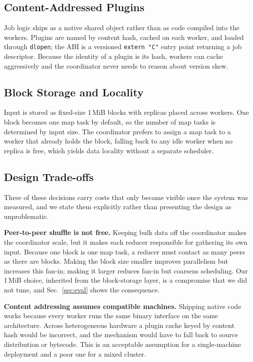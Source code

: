 \documentclass[conference]{IEEEtran}
\begin{document}
\subsection{Content-Addressed Plugins}

Job logic ships as a native shared object rather than as code compiled into
the workers. Plugins are named by content hash, cached on each worker, and
loaded through \texttt{dlopen}; the ABI is a versioned
\texttt{extern "C"} entry point returning a job descriptor. Because the
identity of a plugin is its hash, workers can cache aggressively and the
coordinator never needs to reason about version skew.

\subsection{Block Storage and Locality}

Input is stored as fixed-size 1\,MiB blocks with replicas placed across
workers. One block becomes one map task by default, so the number of map
tasks is determined by input size. The coordinator prefers to assign a map
task to a worker that already holds the block, falling back to any idle
worker when no replica is free, which yields data locality without a
separate scheduler.

\subsection{Design Trade-offs}

Three of these decisions carry costs that only became visible once the
system was measured, and we state them explicitly rather than presenting the
design as unproblematic.

\textbf{Peer-to-peer shuffle is not free.} Keeping bulk data off the
coordinator makes the coordinator scale, but it makes each reducer
responsible for gathering its own input. Because one block is one map task,
a reducer must contact as many peers as there are blocks. Making the block
size smaller improves parallelism but increases this fan-in; making it
larger reduces fan-in but coarsens scheduling. Our 1\,MiB choice, inherited
from the block-storage layer, is a compromise that we did not tune, and
Sec.~\ref{sec:eval} shows the consequence.

\textbf{Content addressing assumes compatible machines.} Shipping native
code works because every worker runs the same binary interface on the same
architecture. Across heterogeneous hardware a plugin cache keyed by content
hash would be incorrect, and the mechanism would have to fall back to
source distribution or bytecode. This is an acceptable assumption for a
single-machine deployment and a poor one for a mixed cluster.
\end{document}
